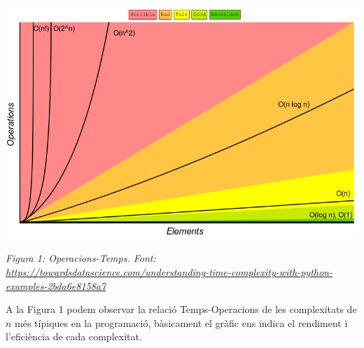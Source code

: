 \begin{center}
\includegraphics[width=.9\textwidth]{compl.png}

\caption{\emph{Figura 1: Operacions-Temps. Font: \url{https://towardsdatascience.com/understanding-time-complexity-with-python-examples-2bda6e8158a7}}}
\end{center}

A la Figura 1 podem observar la relació Temps-Operacions de les complexitats de $n$ més típiques en la programació, bàsicament el gràfic ens indica el rendiment i l'eficiència de cada complexitat. \newline


